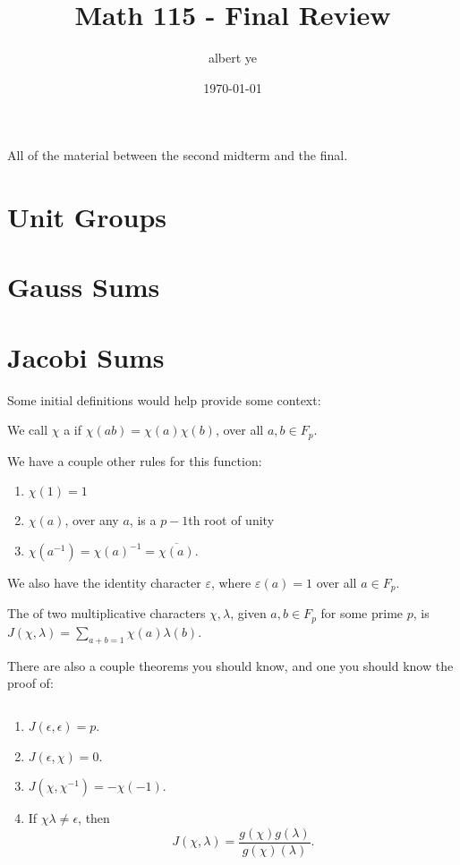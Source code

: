 \documentclass{article}
\title{Math 115 - Final Review}
\author{albert ye}
\date{\today}
\begin{document}
	\maketitle
	All of the material between the second midterm and the final.
	\section{Unit Groups}
	\section{Gauss Sums}
	\section{Jacobi Sums}
	Some initial definitions would help provide some context:
	\begin{definition}
		We call $\chi$ a  if $\chi(ab) = \chi(a) \chi(b)$, over all $a, b \in F_p$.
	\end{definition}

	We have a couple other rules for this function:
	\begin{enumerate}
		\item $\chi(1) = 1$
		\item $\chi(a)$, over any $a$, is a $p - 1$th root of unity
		\item $\chi(a^{-1}) = \chi(a)^{-1} = \overline{\chi(a)}$.
	\end{enumerate}

	We also have the identity character $\varepsilon$, where $\varepsilon(a) = 1$ over all $a \in F_p$. 

	\begin{definition} 
		The  of two multiplicative characters $\chi, \lambda$, given $a, b \in F_p$ for some prime $p$, is $J(\chi, \lambda) = \sum_{a + b = 1} \chi(a) \lambda(b)$.
	\end{definition}

	There are also a couple theorems you should know, and one you should know the proof of:
	\begin{theorem}
		$\qquad$
		\begin{enumerate}
			\item $J(\epsilon, \epsilon) = p$.
			\item $J(\epsilon, \chi) = 0$.
			\item $J(\chi, \chi^{-1}) = - \chi(-1)$.
			\item If $\chi \lambda \neq \epsilon$, then \[J(\chi, \lambda) = \frac{g(\chi)g(\lambda)}{g(\chi)(\lambda)}.\] 
		\end{enumerate}
	\end{theorem}
\end{document}
